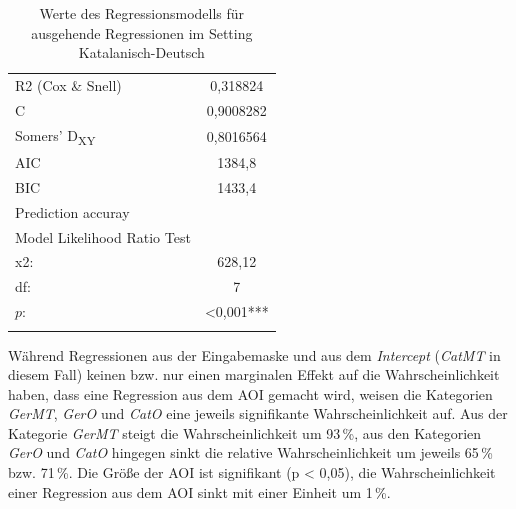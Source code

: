\begin{table}[p]
\begin{tabular}{lS[table-format=<4.7{***}]}
    {R2 (Cox \& Snell)} 						&	0,318824 \\
    {C} 						&	0,9008282 \\
    {Somers' D\textsubscript{XY}} 					&		0,8016564 \\
    {AIC} 						&	1384,8 \\
    {BIC} 						&	1433,4 \\
    Prediction accuray & \\	
    Model Likelihood Ratio Test\\
    x2: & 628,12\\
    df: & 7\\
    $p$: & <0,001{***}\\
        \lspbottomrule
    \end{tabular}
    \caption[Werte des Regressionsmodells für ausgehende Regressionen]
            {Werte des Regressionsmodells für ausgehende Regressionen 
             im Setting Katalanisch-Deutsch\label{K6:tab:CatDe:RegOut-Modell-Stats}}
\end{table}





Während Regressionen aus der Eingabemaske und aus dem \emph{Intercept} (\emph{CatMT} in diesem Fall) keinen bzw. nur einen marginalen Effekt auf die Wahrscheinlichkeit haben, dass eine Regression aus dem AOI gemacht wird, weisen die Kategorien \emph{GerMT}, \emph{GerO} und \emph{CatO} eine jeweils signifikante Wahrscheinlichkeit auf. Aus der Kategorie \emph{GerMT} steigt die Wahrscheinlichkeit um 93\,\%, aus den Kategorien \emph{GerO} und \emph{CatO} hingegen sinkt die relative Wahrscheinlichkeit um jeweils 65\,\% bzw. 71\,\%. Die Größe der AOI ist signifikant (p < 0,05), die Wahrscheinlichkeit einer Regression aus dem AOI sinkt mit einer Einheit um 1\,\%.




